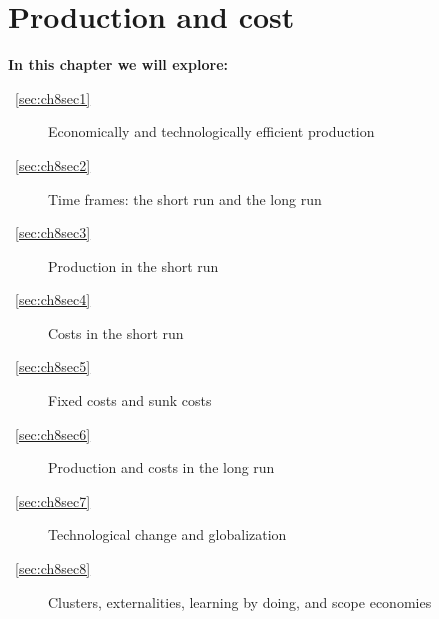 \chapter{Production and cost} \label{chap:prodcost}

\begin{topics}
\textbf{In this chapter we will explore:}
\begin{description}
\item [~\ref{sec:ch8sec1}] Economically and technologically efficient production
\item [~\ref{sec:ch8sec2}] Time frames: the short run and the long run
\item [~\ref{sec:ch8sec3}] Production in the short run
\item [~\ref{sec:ch8sec4}] Costs in the short run
\item [~\ref{sec:ch8sec5}] Fixed costs and sunk costs
\item [~\ref{sec:ch8sec6}] Production and costs in the long run
\item [~\ref{sec:ch8sec7}] Technological change and globalization
\item [~\ref{sec:ch8sec8}] Clusters, externalities, learning by doing, and scope economies
\end{description}
\end{topics}